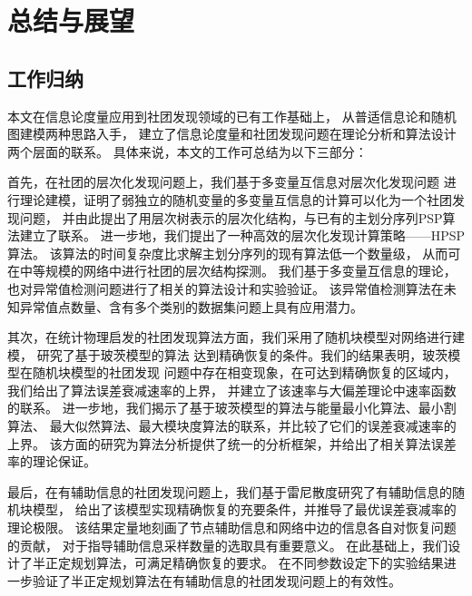 \chapter{总结与展望}\label{chp:summary}
\section{工作归纳}
本文在信息论度量应用到社团发现领域的已有工作基础上，
从普适信息论和随机图建模两种思路入手，
建立了信息论度量和社团发现问题在理论分析和算法设计两个层面的联系。
具体来说，本文的工作可总结为以下三部分：

首先，在社团的层次化发现问题上，我们基于多变量互信息对层次化发现问题
进行理论建模，证明了弱独立的随机变量的多变量互信息的计算可以化为一个社团发现问题，
并由此提出了用层次树表示的层次化结构，与已有的主划分序列PSP算法建立了联系。
进一步地，我们提出了一种高效的层次化发现计算策略——HPSP算法。
该算法的时间复杂度比求解主划分序列的现有算法低一个数量级，
从而可在中等规模的网络中进行社团的层次结构探测。
我们基于多变量互信息的理论，也对异常值检测问题进行了相关的算法设计和实验验证。
该异常值检测算法在未知异常值点数量、含有多个类别的数据集问题上具有应用潜力。

其次，在统计物理启发的社团发现算法方面，我们采用了随机块模型对网络进行建模，
研究了基于玻茨模型的算法
达到精确恢复的条件。我们的结果表明，玻茨模型在随机块模型的社团发现
问题中存在相变现象，在可达到精确恢复的区域内，我们给出了算法误差衰减速率的上界，
并建立了该速率与大偏差理论中速率函数的联系。
进一步地，我们揭示了基于玻茨模型的算法与能量最小化算法、最小割算法、
最大似然算法、最大模块度算法的联系，并比较了它们的误差衰减速率的上界。
该方面的研究为算法分析提供了统一的分析框架，并给出了相关算法误差率的理论保证。

最后，在有辅助信息的社团发现问题上，我们基于雷尼散度研究了有辅助信息的随机块模型，
给出了该模型实现精确恢复的充要条件，并推导了最优误差衰减率的理论极限。
该结果定量地刻画了节点辅助信息和网络中边的信息各自对恢复问题的贡献，
对于指导辅助信息采样数量的选取具有重要意义。
在此基础上，我们设计了半正定规划算法，可满足精确恢复的要求。
在不同参数设定下的实验结果进一步验证了半正定规划算法在有辅助信息的社团发现问题上的有效性。


